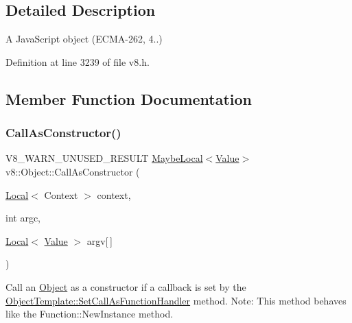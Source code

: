 \subsection{Detailed Description}
A Java\+Script object (E\+C\+M\+A-\/262, 4..) 

Definition at line 3239 of file v8.\+h.



\subsection{Member Function Documentation}
\mbox{\label{classv8_1_1Object_a10dcefb0bd595a959234703690a02530}} 
\subsubsection{\texorpdfstring{Call\+As\+Constructor()}{CallAsConstructor()}}
{\footnotesize\ttfamily V8\+\_\+\+W\+A\+R\+N\+\_\+\+U\+N\+U\+S\+E\+D\+\_\+\+R\+E\+S\+U\+LT \mbox{\hyperlink{classv8_1_1MaybeLocal}{Maybe\+Local}}$<$\mbox{\hyperlink{classv8_1_1Value}{Value}}$>$ v8\+::\+Object\+::\+Call\+As\+Constructor (\begin{DoxyParamCaption}\item[{\mbox{\hyperlink{classv8_1_1Local}{Local}}$<$ Context $>$}]{context,  }\item[{int}]{argc,  }\item[{\mbox{\hyperlink{classv8_1_1Local}{Local}}$<$ \mbox{\hyperlink{classv8_1_1Value}{Value}} $>$}]{argv\mbox{[}$\,$\mbox{]} }\end{DoxyParamCaption})}

Call an \mbox{\hyperlink{classv8_1_1Object}{Object}} as a constructor if a callback is set by the \mbox{\hyperlink{classv8_1_1ObjectTemplate_a1775c8f73e643c339804d2f5b628eddf}{Object\+Template\+::\+Set\+Call\+As\+Function\+Handler}} method. Note\+: This method behaves like the Function\+::\+New\+Instance method. \mbox{\label{classv8_1_1Object_aec7375fe34a800baac4e26deb33ccac0}} 
